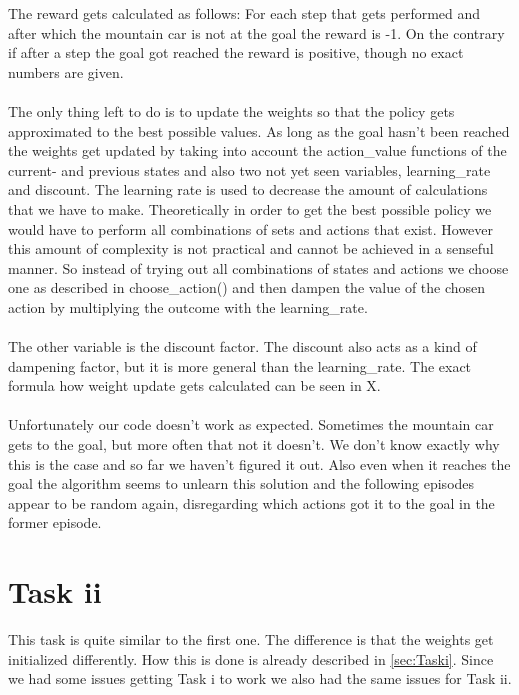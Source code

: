 \documentclass{article}
\begin{document}
	The reward gets calculated as follows: For each step that gets performed and after which the mountain car is not at the goal the reward is -1. On the contrary if after a step the goal got reached the reward is positive, though no exact numbers are given. \\
	\\
	The only thing left to do is to update the weights so that the policy gets approximated to the best possible values. As long as the goal hasn't been reached the weights get updated by taking into account the action\_value functions of the current- and previous states and also two not yet seen variables, learning\_rate and discount. The learning rate is used to decrease the amount of calculations that we have to make. Theoretically in order to get the best possible policy we would have to perform all combinations of sets and actions that exist. However this amount of complexity is not practical and cannot be achieved in a senseful manner. So instead of trying out all combinations of states and actions we choose one as described in choose\_action() and then dampen the value of the chosen action by multiplying the outcome with the learning\_rate. \\
	\\
	The other variable is the discount factor. The discount also acts as a kind of dampening factor, but it is more general than the learning\_rate. The exact formula how weight update gets calculated can be seen in X. \\
	\\
	Unfortunately our code doesn't work as expected. Sometimes the mountain car gets to the goal, but more often that not it doesn't. We don't know exactly why this is the case and so far we haven't figured it out. Also even when it reaches the goal the algorithm seems to unlearn this solution and the following episodes appear to be random again, disregarding which actions got it to the goal in the former episode. 
	
	
	
	
	
	\section{Task ii}
	\label{sec:Taskii}
	This task is quite similar to the first one. The difference is that the weights get initialized differently. How this is done is already described in \autoref{sec:Taski}. Since we had some issues getting Task i to work we also had the same issues for Task ii. 
	
\end{document}
